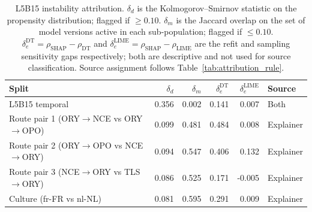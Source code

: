 \begin{table}
\caption{L5B15 instability attribution. $\delta_d$ is the Kolmogorov--Smirnov statistic on the propensity distribution; flagged if $\geq 0.10$. $\delta_m$ is the Jaccard overlap on the set of model versions active in each sub-population; flagged if $\leq 0.10$. $\delta_e^{\mathrm{DT}} = \rho_{\mathrm{SHAP}} - \rho_{\mathrm{DT}}$ and $\delta_e^{\mathrm{LIME}} = \rho_{\mathrm{SHAP}} - \rho_{\mathrm{LIME}}$ are the refit and sampling sensitivity gaps respectively; both are descriptive and not used for source classification. Source assignment follows Table~\ref{tab:attribution_rule}.}
\label{tab:attribution_l5b15}
\begin{tabular}{lrrrrl}
\toprule
Split & $\delta_d$ & $\delta_m$ & $\delta_e^{\mathrm{DT}}$ & $\delta_e^{\mathrm{LIME}}$ & Source \\
\midrule
L5B15 temporal & 0.356 & 0.002 & 0.141 & 0.007 & Both \\
Route pair 1 (ORY$\to$NCE vs ORY$\to$OPO) & 0.099 & 0.481 & 0.484 & 0.008 & Explainer \\
Route pair 2 (ORY$\to$OPO vs NCE$\to$ORY) & 0.094 & 0.547 & 0.406 & 0.132 & Explainer \\
Route pair 3 (NCE$\to$ORY vs TLS$\to$ORY) & 0.086 & 0.525 & 0.171 & -0.005 & Explainer \\
Culture (fr-FR vs nl-NL) & 0.081 & 0.595 & 0.291 & 0.009 & Explainer \\
\bottomrule
\end{tabular}
\end{table}

